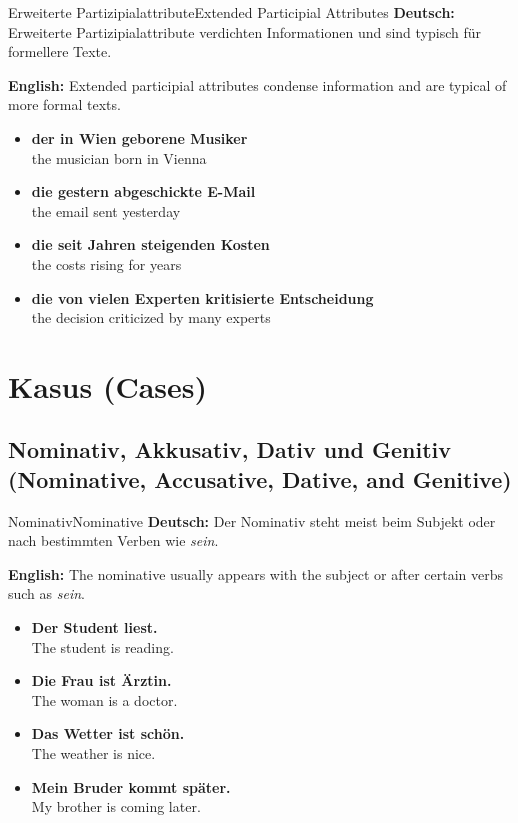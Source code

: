 \documentclass[a4paper,11pt]{article}
\newcommand{\GermanText}[1]{\textbf{Deutsch: }#1\par}
\newcommand{\EnglishText}[1]{{\color{SoftGray}\textbf{English: }#1\par}}
\newcommand{\ExampleItem}[2]{\item \textbf{#1}\\{\color{SoftGray}#2}}
\begin{document}
\begin{grammarentry}{Erweiterte Partizipialattribute}{Extended Participial Attributes}
    \GermanText{Erweiterte Partizipialattribute verdichten Informationen und sind typisch für formellere Texte.}
    \EnglishText{Extended participial attributes condense information and are typical of more formal texts.}
    \begin{exbox}
        \begin{itemize}
            \ExampleItem{der in Wien geborene Musiker}{the musician born in Vienna}
            \ExampleItem{die gestern abgeschickte E-Mail}{the email sent yesterday}
            \ExampleItem{die seit Jahren steigenden Kosten}{the costs rising for years}
            \ExampleItem{die von vielen Experten kritisierte Entscheidung}{the decision criticized by many experts}
        \end{itemize}
    \end{exbox}
\end{grammarentry}

\section{Kasus {\small (Cases)}}

\subsection{Nominativ, Akkusativ, Dativ und Genitiv {\small (Nominative, Accusative, Dative, and Genitive)}}

\begin{grammarentry}{Nominativ}{Nominative}
    \GermanText{Der Nominativ steht meist beim Subjekt oder nach bestimmten Verben wie \textit{sein}.}
    \EnglishText{The nominative usually appears with the subject or after certain verbs such as \textit{sein}.}
    \begin{exbox}
        \begin{itemize}
            \ExampleItem{Der Student liest.}{The student is reading.}
            \ExampleItem{Die Frau ist Ärztin.}{The woman is a doctor.}
            \ExampleItem{Das Wetter ist schön.}{The weather is nice.}
            \ExampleItem{Mein Bruder kommt später.}{My brother is coming later.}
        \end{itemize}
    \end{exbox}
\end{grammarentry}
\end{document}
